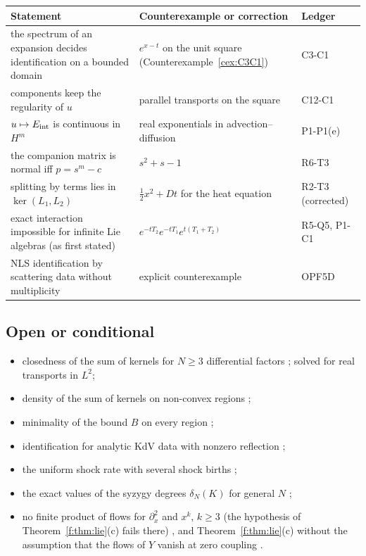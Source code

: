 \begin{center}\small
\begin{tabular}{@{}L{5.2cm}L{6.0cm}L{2.6cm}@{}}
\toprule
Statement & Counterexample or correction & Ledger\\\midrule
the spectrum of an expansion decides identification on a bounded domain & $e^{x-t}$ on the unit square (Counterexample~\ref{cex:C3C1}) & C3-C1\\
components keep the regularity of $u$ & parallel transports on the square & C12-C1\\
$u\mapsto E_{\mathrm{int}}$ is continuous in $H^m$ & real exponentials in advection--diffusion & P1-P1(e)\\
the companion matrix is normal iff $p=s^m-c$ & $s^2+s-1$ & R6-T3\\
splitting by terms lies in $\ker(L_1,L_2)$ & $\tfrac12x^2+Dt$ for the heat equation & R2-T3 (corrected)\\
exact interaction impossible for infinite Lie algebras (as first stated) & $e^{-tT_2}e^{-tT_1}e^{t(T_1+T_2)}$ & R5-Q5, P1-C1\\
NLS identification by scattering data without multiplicity & explicit counterexample & OPF5D\\\bottomrule
\end{tabular}
\end{center}

\subsection{Open or conditional}

\begin{itemize}
\item closedness of the sum of kernels for $N\ge3$ differential factors \openq{} ; solved for real transports in $L^2$;
\item density of the sum of kernels on non-convex regions \openq;
\item minimality of the bound $B$ on every region \openq{} ;
\item identification for analytic KdV data with nonzero reflection \openq{} ;
\item the uniform shock rate with several shock births \condl{} ;
\item the exact values of the syzygy degrees $\delta_N(K)$ for general $N$ \openq{} ;
\item no finite product of flows for $\partial_x^2$ and $x^k$, $k\ge3$ (the hypothesis of Theorem~\ref{f:thm:lie}(c) fails there) \openq{} , and Theorem~\ref{f:thm:lie}(c) without the assumption that the flows of $Y$ vanish at zero coupling \openq{} .
\end{itemize}

